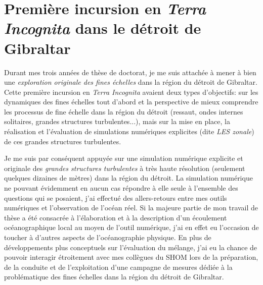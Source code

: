 
\color{blue}
\section{Première incursion en \textit{Terra Incognita} dans le détroit de Gibraltar}
Durant mes trois années de thèse de doctorat, je me suis attachée à mener à bien une \textit{exploration originale des fines échelles} dans la région du détroit de Gibraltar. Cette première incursion en \textit{Terra Incognita} avaient deux types d'objectifs: sur les dynamiques des fines échelles tout d'abord et la perspective de mieux comprendre les processus de fine échelle dans la région du détroit (ressaut, ondes internes solitaires, grandes structures turbulentes...), mais sur la mise en place, la réalisation et l'évaluation de simulations numériques explicites (dite \textit{LES zonale}) de ces grandes structures turbulentes.

Je me suis par conséquent appuyée sur une simulation numérique explicite et originale des \textit{grandes structures turbulentes} à très haute résolution (seulement quelques dizaines de mètres) dans la région du détroit. La simulation numérique ne pouvant évidemment en aucun cas répondre à elle seule à l'ensemble des questions qui se posaient, j'ai effectué des allers-retours entre mes outils numériques et l'observation de l'océan réel. Si la majeure partie de mon travail de thèse a été consacrée à l'élaboration et à la description d'un écoulement océanographique local au moyen de l'outil numérique, j'ai en effet eu l'occasion de toucher à d'autres aspects de l'océanographie physique.
En plus de développements plus conceptuels sur l'évaluation du mélange,  j'ai eu la chance de pouvoir interagir étroitement avec mes collègues du SHOM lors de la préparation, de la conduite et de l'exploitation d'une campagne de mesures dédiée à la problématique des fines échelles dans la région du détroit de Gibraltar.

